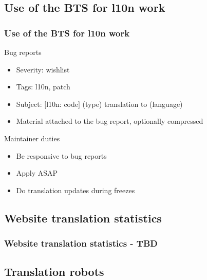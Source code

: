 \documentclass{beamer}
\begin{document}
\subsection{Use of the BTS for l10n work}

\begin{frame}
  \frametitle{Use of the BTS for l10n work}
	\begin{block}
		{Bug reports}
		\begin{itemize}
		\item
			Severity: wishlist
		\item
			Tags: l10n, patch
		\item
			Subject: $[$l10n: code$]$ (type) translation to (language)
		\item
			Material attached to the bug report, optionally compressed
		\end{itemize}
	\end{block}
	\begin{block}
		{Maintainer duties}
		\begin{itemize}
		\item
		{Be responsive to bug reports}
		\item
		{Apply ASAP}
		\item
		{Do translation updates during freezes}
		\end{itemize}
	\end{block}
\end{frame}


\subsection{Website translation statistics}

\begin{frame}
  \frametitle{Website translation statistics - TBD}
\end{frame}


\subsection{Translation robots}
\end{document}
